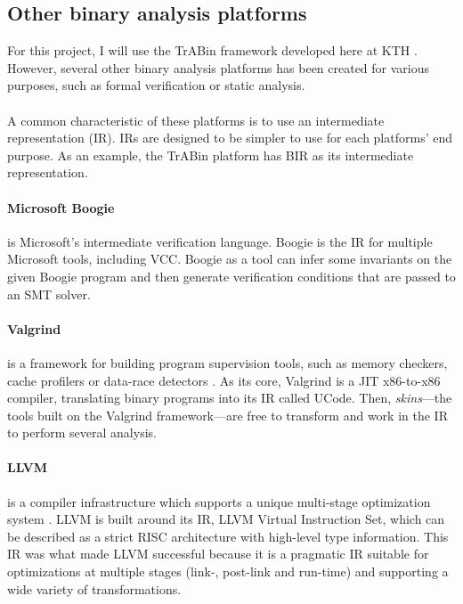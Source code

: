 \documentclass{kththesis}
\begin{document}
\subsection{Other binary analysis platforms}

For this project, I will use the TrABin framework developed here at KTH \cite{lindner_trabin:_2019}. However, several other binary analysis platforms has been created for various purposes, such as formal verification or static analysis.

\paragraph{} A common characteristic of these platforms is to use an intermediate representation (IR). IRs are designed to be simpler to use for each platforms' end purpose. As an example, the TrABin platform has BIR as its intermediate representation.

\paragraph{Microsoft Boogie} is Microsoft's intermediate verification language. Boogie is the IR for multiple Microsoft tools, including VCC. Boogie as a tool can infer some invariants on the given Boogie program and then generate verification conditions that are passed to an SMT solver\footnotemark.


\paragraph{Valgrind} is a framework for building program supervision tools, such as memory checkers, cache profilers or data-race detectors
\cite{nethercote_valgrind:_2003}. As its core, Valgrind is a JIT x86-to-x86 compiler, translating binary programs into its IR called UCode. Then, \textit{skins}---the tools built on the Valgrind framework---are free to transform and work in the IR to perform several analysis.

\paragraph{LLVM} is a compiler infrastructure which supports a unique multi-stage optimization system \cite{lattner_llvm:_2002}. LLVM is built around its IR, LLVM Virtual Instruction Set, which can be described as a strict RISC architecture with high-level type information. This IR was what made LLVM successful because it is a pragmatic IR suitable for optimizations at multiple stages (link-, post-link and run-time) and supporting a wide variety of transformations.
\end{document}
